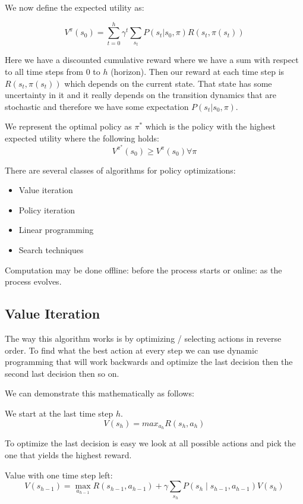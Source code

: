 \documentclass[12pt]{article}
\begin{document}
        We now define the expected utility as:
        
        $$ V^{\pi}(s_0) = \sum_{t=0}^h \gamma^t \sum_{s_t} P(s_t | s_0, \pi) R(s_t, \pi(s_t)) $$

        Here we have a discounted cumulative reward where we have a sum with respect to all time steps from 0 to $h$
        (horizon). Then our reward at each time step is $R(s_t, \pi (s_t))$ which depends on the current state. That
        state has some uncertainty in it and it really depends on the transition dynamics that are stochastic and
        therefore we have some expectation $P(s_t | s_0, \pi)$.

        We represent the optimal policy as $\pi^*$ which is the policy with the highest expected utility where the
        following holds:
        $$ V^{\pi^*} (s_0) \geq V^{\pi} (s_0) \forall \pi$$

        There are several classes of algorithms for policy optimizations:
        \begin{itemize}
            \item Value iteration
            \item Policy iteration
            \item Linear programming
            \item Search techniques
        \end{itemize}

        Computation may be done offline: before the process starts or online: as the process evolves.
    
    \subsection{Value Iteration}
        The way this algorithm works is by optimizing / selecting actions in reverse order. To find what the best
        action at every step we can use dynamic programming that will work backwards and optimize the last decision
        then the second last decision then so on. 

        We can demonstrate this mathematically as follows:
        
        We start at the last time step $h$.
        $$ V(s_h) = max_{a_h} R(s_h, a_h) $$

        To optimize the last decision is easy we look at all possible actions and pick the one that yields the
        highest reward. 

        Value with one time step left:
        $$ V\left(s_{h-1}\right)=\max _{a_{h-1}} R\left(s_{h-1}, a_{h-1}\right)+\gamma \sum_{s_{h}}
        P(s_{h} \mid s_{h-1}, a_{h-1}) V\left(s_{h}\right) $$
\end{document}
